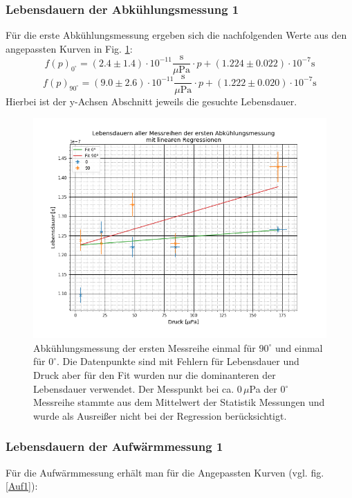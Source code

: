\subsubsection{Lebensdauern der Abkühlungsmessung 1}
Für die erste Abkühlungsmessung ergeben sich die nachfolgenden Werte aus den angepassten Kurven in Fig. \ref{Abk1}:
\begin{equation*}
	f(p)_{0^\circ}=(2.4 \pm 1.4)\cdot 10^{-11} \frac{\text{s}}{\text{$\mu$Pa}}\cdot p + (1.224\pm 0.022)\cdot 10^{-7} \text{s}
\end{equation*}
\begin{equation*}
	f(p)_{90^\circ}=(9.0\pm 2.6)\cdot 10^{-11} \frac{\text{s}}{\text{$\mu$Pa}}\cdot p + (1.222\pm 0.020)\cdot 10^{-7} \text{s}
\end{equation*}
Hierbei ist der y-Achsen Abschnitt jeweils die gesuchte Lebensdauer.
\begin{figure}[ht]
	\includegraphics[scale=0.5]{Bild/Abk1}
	\centering
	\caption[Druck zu Lebensdauer Fit für Abkühlung 1]{Abkühlungsmessung der ersten Messreihe einmal für $90^\circ$ und einmal für $0^\circ$. Die Datenpunkte sind mit Fehlern für Lebensdauer und Druck aber für den Fit wurden nur die dominanteren der Lebensdauer verwendet. Der Messpunkt bei ca. $0\,\mu$Pa der 0$^\circ$ Messreihe stammte aus dem Mittelwert der Statistik Messungen und wurde als Ausreißer nicht bei der Regression berücksichtigt.}
	\label{Abk1}
\end{figure}
\FloatBarrier
\subsubsection{Lebensdauern der Aufwärmmessung 1}
Für die Aufwärmmessung erhält man für die Angepassten Kurven (vgl. fig. \ref{Auf1}):

